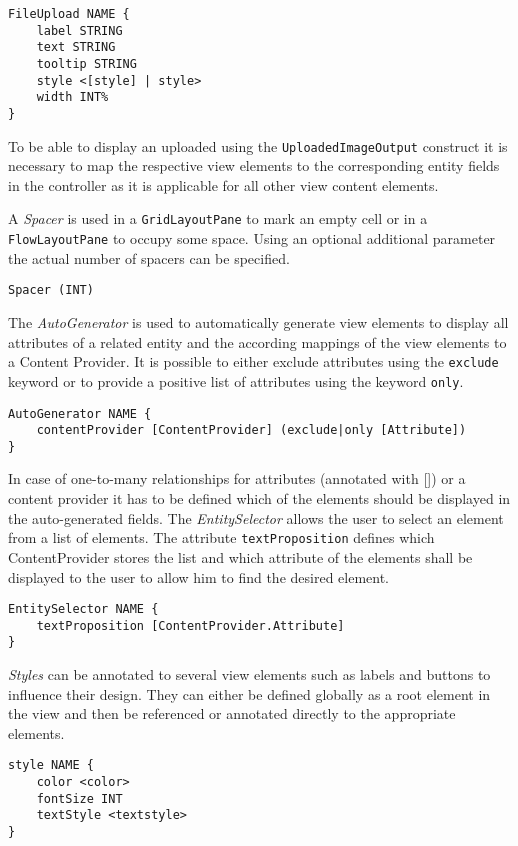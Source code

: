 \begin{lstlisting}
FileUpload NAME {
	label STRING
	text STRING
	tooltip STRING		
	style <[style] | style>
	width INT%
}	
\end{lstlisting}

To be able to display an uploaded using the \lstinline!UploadedImageOutput! construct it is necessary to map the respective view elements to the corresponding entity fields in the controller as it is applicable for all other view content elements. 

A \textit{Spacer} is used in a \lstinline!GridLayoutPane! to mark an empty cell or in a \lstinline!FlowLayoutPane! to occupy some space. Using an optional additional parameter the actual number of spacers can be specified.
\begin{lstlisting}
Spacer (INT)
\end{lstlisting}

The \textit{AutoGenerator} is used to automatically generate view elements to display all attributes of a related entity and the according mappings of the view elements to a Content Provider. It is possible to either exclude attributes using the \lstinline!exclude! keyword or to provide a positive list of attributes using the keyword \lstinline!only!.
\begin{lstlisting}
AutoGenerator NAME {
	contentProvider [ContentProvider] (exclude|only [Attribute])
}
\end{lstlisting}

In case of one-to-many relationships for attributes (annotated with []) or a content provider it has to be defined which of the elements should be displayed in the auto-generated fields. The \textit{EntitySelector} allows the user to select an element from a list of elements. The attribute \lstinline!textProposition! defines which ContentProvider stores the list and which attribute of the elements shall be displayed to the user to allow him to find the desired element.
\begin{lstlisting}
EntitySelector NAME {
	textProposition [ContentProvider.Attribute]
}
\end{lstlisting}

\textit{Styles} can be annotated to several view elements such as labels and buttons to influence their design. They can either be defined globally as a root element in the view and then be referenced or annotated directly to the appropriate elements.
\begin{lstlisting}
style NAME {
	color <color>
	fontSize INT
	textStyle <textstyle>
}
\end{lstlisting}

